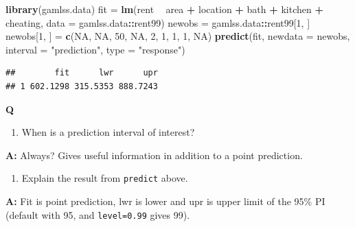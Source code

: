 \documentclass[10pt,ignorenonframetext,]{beamer}
\newenvironment{Shaded}{\begin{snugshade}}{\end{snugshade}}
\newcommand{\KeywordTok}[1]{\textcolor[rgb]{0.13,0.29,0.53}{\textbf{#1}}}
\newcommand{\DataTypeTok}[1]{\textcolor[rgb]{0.13,0.29,0.53}{#1}}
\newcommand{\DecValTok}[1]{\textcolor[rgb]{0.00,0.00,0.81}{#1}}
\newcommand{\StringTok}[1]{\textcolor[rgb]{0.31,0.60,0.02}{#1}}
\newcommand{\OtherTok}[1]{\textcolor[rgb]{0.56,0.35,0.01}{#1}}
\newcommand{\OperatorTok}[1]{\textcolor[rgb]{0.81,0.36,0.00}{\textbf{#1}}}
\newcommand{\NormalTok}[1]{#1}
\providecommand{\tightlist}{%
  \setlength{\itemsep}{0pt}\setlength{\parskip}{0pt}}
\begin{document}
\begin{frame}[fragile]

\footnotesize

\begin{Shaded}
\begin{Highlighting}[]
\KeywordTok{library}\NormalTok{(gamlss.data)}
\NormalTok{fit =}\StringTok{ }\KeywordTok{lm}\NormalTok{(rent }\OperatorTok{~}\StringTok{ }\NormalTok{area }\OperatorTok{+}\StringTok{ }\NormalTok{location }\OperatorTok{+}\StringTok{ }\NormalTok{bath }\OperatorTok{+}\StringTok{ }\NormalTok{kitchen }\OperatorTok{+}\StringTok{ }\NormalTok{cheating, }\DataTypeTok{data =}\NormalTok{ gamlss.data}\OperatorTok{::}\NormalTok{rent99)}
\NormalTok{newobs =}\StringTok{ }\NormalTok{gamlss.data}\OperatorTok{::}\NormalTok{rent99[}\DecValTok{1}\NormalTok{, ]}
\NormalTok{newobs[}\DecValTok{1}\NormalTok{, ] =}\StringTok{ }\KeywordTok{c}\NormalTok{(}\OtherTok{NA}\NormalTok{, }\OtherTok{NA}\NormalTok{, }\DecValTok{50}\NormalTok{, }\OtherTok{NA}\NormalTok{, }\DecValTok{2}\NormalTok{, }\DecValTok{1}\NormalTok{, }\DecValTok{1}\NormalTok{, }\DecValTok{1}\NormalTok{, }\OtherTok{NA}\NormalTok{)}
\KeywordTok{predict}\NormalTok{(fit, }\DataTypeTok{newdata =}\NormalTok{ newobs, }\DataTypeTok{interval =} \StringTok{"prediction"}\NormalTok{, }\DataTypeTok{type =} \StringTok{"response"}\NormalTok{)}
\end{Highlighting}
\end{Shaded}

\begin{verbatim}
##        fit      lwr      upr
## 1 602.1298 315.5353 888.7243
\end{verbatim}

\normalsize

\textbf{Q}

\begin{enumerate}
\def\labelenumi{\arabic{enumi}.}
\tightlist
\item
  When is a prediction interval of interest?
\end{enumerate}

\textbf{A:} Always? Gives useful information in addition to a point
prediction.

\begin{enumerate}
\def\labelenumi{\arabic{enumi}.}
\setcounter{enumi}{1}
\tightlist
\item
  Explain the result from \texttt{predict} above.
\end{enumerate}

\textbf{A:} Fit is point prediction, lwr is lower and upr is upper limit
of the 95\% PI (default with 95, and \texttt{level=0.99} gives 99).

\end{frame}
\end{document}
